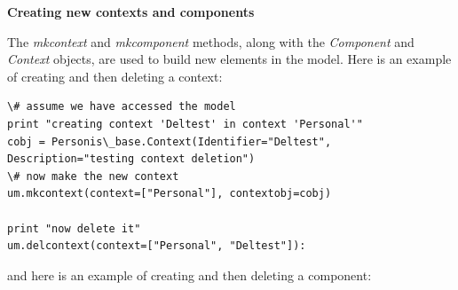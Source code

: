 \documentclass[a4paper,10pt,english]{sphinxmanual}
\begin{document}
\textbf{Creating new contexts and components}

The \emph{mkcontext} and \emph{mkcomponent} methods, along with the \emph{Component} and \emph{Context} objects, are used to build
new elements in the model. Here is an example of creating and then deleting a context:

\begin{Verbatim}[commandchars=\\\{\}]
\# assume we have accessed the model
print "creating context 'Deltest' in context 'Personal'"
cobj = Personis\_base.Context(Identifier="Deltest", Description="testing context deletion")
\# now make the new context
um.mkcontext(context=["Personal"], contextobj=cobj)

print "now delete it"
um.delcontext(context=["Personal", "Deltest"]):
\end{Verbatim}

and here is an example of creating and then deleting a component:
\end{document}
